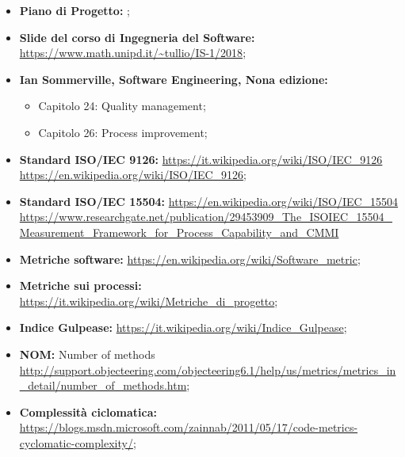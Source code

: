 \begin{itemize}
	\item \textbf{Piano di Progetto:} \PdP;
	\item \textbf{Slide del corso di Ingegneria del Software:}\newline
		  		 \url{https://www.math.unipd.it/~tullio/IS-1/2018};
	\item \textbf{Ian Sommerville, Software Engineering, Nona edizione:}
		\begin{itemize}
		  	\item Capitolo 24: Quality management;
		  	\item Capitolo 26: Process improvement;
		\end{itemize}
	\item \textbf{Standard ISO/IEC 9126:}\newline
		  		  \url{https://it.wikipedia.org/wiki/ISO/IEC_9126}\newline
				  \url{https://en.wikipedia.org/wiki/ISO/IEC_9126};
	\item \textbf{Standard ISO/IEC 15504:}\newline
				  \url{https://en.wikipedia.org/wiki/ISO/IEC_15504}\newline
				  \url{https://www.researchgate.net/publication/29453909_The_ISOIEC_15504_Measurement_Framework_for_Process_Capability_and_CMMI}
	\item \textbf{Metriche software:}\newline
				  \url{https://en.wikipedia.org/wiki/Software_metric};
	\item \textbf{Metriche sui processi:}\newline
				  \url{https://it.wikipedia.org/wiki/Metriche_di_progetto};
	\item \textbf{Indice Gulpease:}\newline
				 \url{https://it.wikipedia.org/wiki/Indice_Gulpease};
	\item \textbf{NOM:} Number of methods\newline
				  \url{http://support.objecteering.com/objecteering6.1/help/us/metrics/metrics_in_detail/number_of_methods.htm};
	\item \textbf{Complessità ciclomatica: }\newline
				 \url{https://blogs.msdn.microsoft.com/zainnab/2011/05/17/code-metrics-cyclomatic-complexity/};
		
\end{itemize}